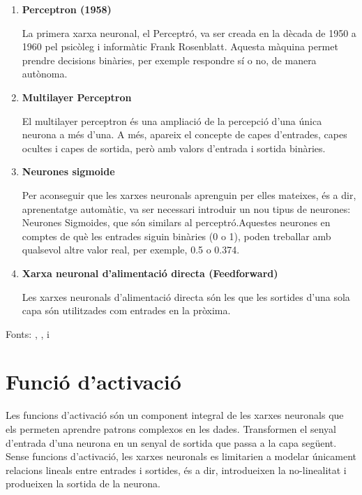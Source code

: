\begin{enumerate}
    \item \textbf{Perceptron (1958)}

    La primera xarxa neuronal, el Perceptró, va ser creada en la dècada de 1950 a 1960 pel psicòleg i informàtic Frank Rosenblatt. Aquesta màquina permet prendre decisions binàries, per exemple respondre sí o no, de manera autònoma.

    \item \textbf{Multilayer Perceptron}

    El multilayer perceptron és una ampliació de la percepció d'una única neurona a més d'una. A més, apareix el concepte de capes d'entrades, capes ocultes i capes de sortida, però amb valors d'entrada i sortida binàries.
\clearpage
    \item \textbf{Neurones sigmoide}

    Per aconseguir que les xarxes neuronals aprenguin per elles mateixes, és a dir, aprenentatge automàtic, va ser necessari introduir un nou tipus de neurones: Neurones Sigmoides, que són similars al perceptró.Aquestes neurones en comptes de què les entrades siguin binàries (0 o 1), poden treballar amb qualsevol altre valor real, per exemple, 0.5 o 0.374.

    \item \textbf{Xarxa neuronal d'alimentació directa (Feedforward)}

    Les xarxes neuronals d'alimentació directa són les que les sortides d'una sola capa són utilitzades com entrades en la pròxima.
\end{enumerate}
Fonts: \cite{TreballFinalDeGrau}, \cite{Medium}, \cite{MediumSigmoid} i \cite{FeedForward}
\section{Funció d'activació}\label{Activació}

Les funcions d'activació són un component integral de les xarxes neuronals que els permeten aprendre patrons complexos en les dades. Transformen el senyal d'entrada d'una neurona en un senyal de sortida que passa a la capa següent. Sense funcions d'activació, les xarxes neuronals es limitarien a modelar únicament relacions lineals entre entrades i sortides, és a dir, introdueixen la no-linealitat i produeixen la sortida de la neurona.

